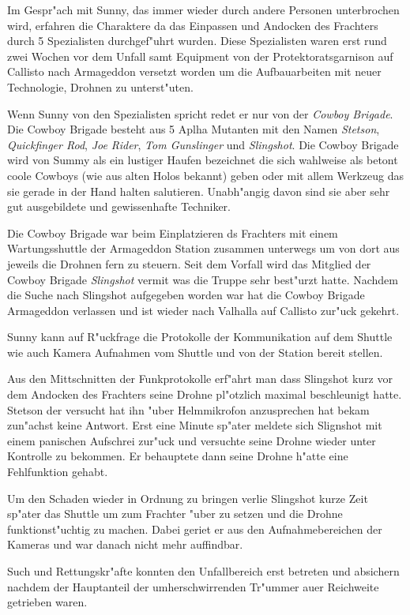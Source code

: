 Im Gespr"ach mit Sunny, das immer wieder durch andere Personen unterbrochen wird, erfahren die Charaktere da\3 das Einpassen und Andocken des Frachters durch 5 Spezialisten durchgef"uhrt wurden. Diese Spezialisten waren erst rund zwei Wochen vor dem Unfall samt Equipment von  der Protektoratsgarnison auf Callisto nach Armageddon versetzt worden um die Aufbauarbeiten mit neuer Technologie, Drohnen zu unterst"uten.

Wenn Sunny von den Spezialisten spricht redet er nur von der \emph{Cowboy Brigade}. Die Cowboy Brigade besteht aus 5 Aplha Mutanten mit den Namen \emph{Stetson}, \emph{Quickfinger Rod}, \emph{Joe Rider}, \emph{Tom Gunslinger} und \emph{Slingshot}. Die Cowboy Brigade wird von Summy als ein lustiger Haufen bezeichnet die sich wahlweise als betont coole Cowboys (wie aus alten Holos bekannt) geben oder mit allem Werkzeug das sie gerade in der Hand halten salutieren. Unabh"angig davon sind sie aber sehr gut ausgebildete und gewissenhafte Techniker.

Die Cowboy Brigade war beim Einplatzieren ds Frachters mit einem Wartungsshuttle der Armageddon Station zusammen unterwegs um von dort aus jeweils die Drohnen fern zu steuern. Seit dem Vorfall wird das Mitglied der Cowboy Brigade \emph{Slingshot} vermi\3t was die Truppe sehr best"urzt hatte. Nachdem die Suche nach Slingshot aufgegeben worden war hat die Cowboy Brigade Armageddon verlassen und ist wieder nach Valhalla auf Callisto zur"uck gekehrt.

Sunny kann auf R"uckfrage die Protokolle der Kommunikation auf dem Shuttle wie auch Kamera Aufnahmen vom Shuttle und von der Station bereit stellen.

Aus den Mittschnitten der Funkprotokolle erf"ahrt man dass Slingshot kurz vor dem Andocken des Frachters seine Drohne pl"otzlich maximal beschleunigt hatte. Stetson der versucht hat ihn "uber Helmmikrofon anzusprechen hat bekam zun"achst keine Antwort. Erst eine Minute sp"ater
meldete sich Slignshot mit einem panischen Aufschrei zur"uck und versuchte seine Drohne wieder unter Kontrolle zu bekommen. Er behauptete
dann seine Drohne h"atte eine Fehlfunktion gehabt.

Um den Schaden wieder in Ordnung zu bringen verlie\3 Slingshot kurze Zeit sp"ater das Shuttle um zum Frachter "uber zu setzen und die Drohne funktionst"uchtig zu machen. Dabei geriet er aus den Aufnahmebereichen der Kameras und war danach nicht mehr auffindbar.

Such und Rettungskr"afte konnten den Unfallbereich erst betreten und absichern nachdem der Hauptanteil der umherschwirrenden Tr"ummer au\3er Reichweite getrieben waren.

